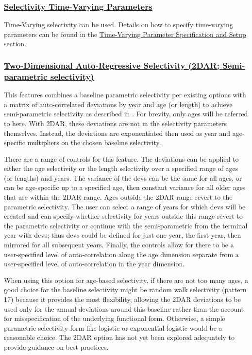\hypertarget{Selex-TV}{}
\subsubsection[Selectivity Time-Varying Parameters]{\protect\hyperlink{Selex-TV}{Selectivity Time-Varying Parameters}}
Time-Varying selectivity can be used. Details on how to specify time-varying parameters can be found in the \hyperlink{tvOrder}{Time-Varying Parameter Specification and Setup} section.

\hypertarget{TwoDAR}{}
\subsubsection[Two-Dimensional Auto-Regressive Selectivity (2DAR; Semi-parametric selectivity)]{\protect\hyperlink{TwoDAR}{Two-Dimensional Auto-Regressive Selectivity (2DAR; Semi-parametric selectivity)}}
This features combines a baseline parametric selectivity per existing options with a matrix of auto-correlated deviations by year and age (or length) to achieve semi-parametric selectivity as described in \citet{xu-new-2019}. For brevity, only ages will be referred to here. With 2DAR, these deviations are not in the selectivity parameters themselves. Instead, the deviations are exponentiated then used as year and age-specific multipliers on the chosen baseline selectivity.

There are a range of controls for this feature. The deviations can be applied to either the age selectivity or the length selectivity over a specified range of ages (or lengths) and years. The variance of the devs can be the same for all ages, or can be age-specific up to a specified age, then constant variance for all older ages that are within the 2DAR range. Ages outside the 2DAR range revert to the parametric selectivity. The user can select a range of years for which devs will be created and can specify whether selectivity for years outside this range revert to the parametric selectivity or continue with the semi-parametric from the terminal year with devs; thus devs could be defined for just one year, the first year, then mirrored for all subsequent years. Finally, the controls allow for there to be a user-specified level of auto-correlation along the age dimension separate from a user-specified level of auto-correlation in the year dimension.

When using this option for age-based selectivity, if there are not too many ages, a good choice for the baseline selectivity might be random walk selectivity (pattern 17) because it provides the most flexibility, allowing the 2DAR deviations to be used only for the annual deviations around this baseline rather than the account for misspecification of the underlying functional form. Otherwise, a simple parametric selectivity form like logistic or exponential logistic would be a reasonable choice. The 2DAR option has not yet been explored adequately to provide guidance on best practices.

